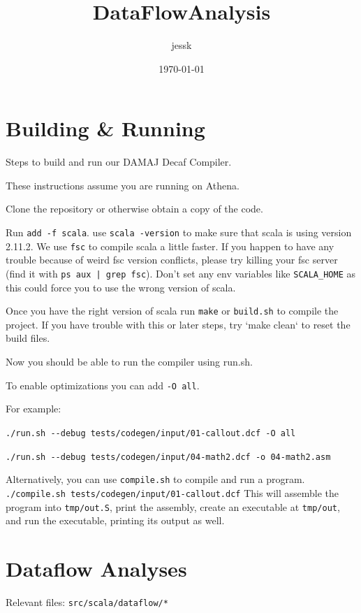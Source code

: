 \documentclass[11pt]{article}
\title{DataFlowAnalysis}
\author{jessk}
\date{\today}
\begin{document}
\maketitle

\setcounter{tocdepth}{3}
\tableofcontents
\vspace*{1cm}
\section{Building \& Running}
\label{sec-1}

  Steps to build and run our DAMAJ Decaf Compiler.
  
  These instructions assume you are running on Athena.
  
  Clone the repository or otherwise obtain a copy of the code.

  Run \verb~add -f scala~. use \verb~scala -version~ to make sure that scala is using version 2.11.2.
  We use \verb~fsc~ to compile scala a little faster. If you happen to have any trouble because of weird
  fsc version conflicts, please try killing your fsc server (find it with \verb~ps aux | grep fsc~).
  Don't set any env variables like \verb~SCALA_HOME~ as this could force you to use the wrong version
  of scala.
  
  Once you have the right version of scala run \verb~make~ or \verb~build.sh~ to compile the project.
  If you have trouble with this or later steps, try `make clean` to reset the build files.
  
  Now you should be able to run the compiler using run.sh.

  To enable optimizations you can add \verb~-O all~.

  For example:

  \verb~./run.sh --debug tests/codegen/input/01-callout.dcf -O all~

  \verb~./run.sh --debug tests/codegen/input/04-math2.dcf -o 04-math2.asm~

  Alternatively, you can use \verb~compile.sh~ to compile and run a program.
  \verb~./compile.sh tests/codegen/input/01-callout.dcf~
  This will assemble the program into \verb~tmp/out.S~, print the assembly, create an executable at \verb~tmp/out~,
  and run the executable, printing its output as well.
\section{Dataflow Analyses}
\label{sec-2}

  Relevant files: \verb~src/scala/dataflow/*~
  
\end{document}
